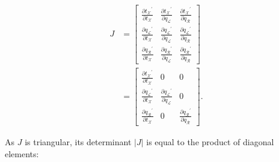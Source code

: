 \documentclass[12pt]{article}
\begin{document}
\begin{align}
	J &= \begin{bmatrix} \frac{\partial {t_\mathcal{X}}^\prime}{\partial t_\mathcal{X}} & \frac{\partial {t_\mathcal{X}}^\prime}{\partial q_\mathcal{L}} & \frac{\partial {t_\mathcal{X}}^\prime}{\partial q_\mathcal{R}} \\
						\frac{\partial {q_\mathcal{L}}^\prime}{\partial t_\mathcal{X}} & \frac{\partial {q_\mathcal{L}}^\prime}{\partial q_\mathcal{L}} & \frac{\partial {q_\mathcal{L}}^\prime}{\partial q_\mathcal{R}} \\
						\frac{\partial {q_\mathcal{R}}^\prime}{\partial t_\mathcal{X}} & \frac{\partial {q_\mathcal{R}}^\prime}{\partial q_\mathcal{L}} & \frac{\partial {q_\mathcal{R}}^\prime}{\partial q_\mathcal{R}} \end{bmatrix} \nonumber \\
		&= \begin{bmatrix} \frac{\partial {t_\mathcal{X}}^\prime}{\partial t_\mathcal{X}} & 0 & 0 \\
						\frac{\partial {q_\mathcal{L}}^\prime}{\partial t_\mathcal{X}} & \frac{\partial {q_\mathcal{L}}^\prime}{\partial q_\mathcal{L}} & 0\\
						\frac{\partial {q_\mathcal{R}}^\prime}{\partial t_\mathcal{X}} & 0 & \frac{\partial {q_\mathcal{R}}^\prime}{\partial q_\mathcal{R}} \end{bmatrix}.
\end{align}



As $J$ is triangular, its determinant $|J|$ is equal to the product of diagonal elements:
\end{document}
